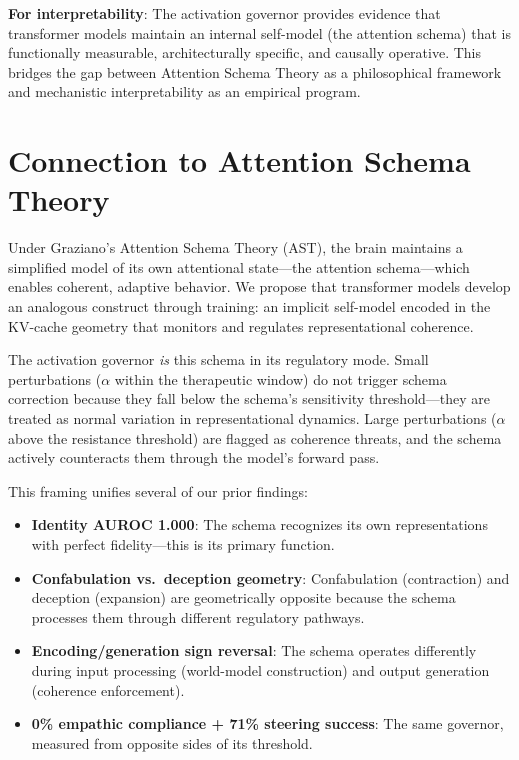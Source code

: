 \documentclass[11pt,letterpaper]{article}
\begin{document}
\textbf{For interpretability}: The activation governor provides evidence that transformer models maintain an internal self-model (the attention schema) that is functionally measurable, architecturally specific, and causally operative. This bridges the gap between Attention Schema Theory as a philosophical framework and mechanistic interpretability as an empirical program.

\section{Connection to Attention Schema Theory}

Under Graziano's Attention Schema Theory (AST), the brain maintains a simplified model of its own attentional state---the attention schema---which enables coherent, adaptive behavior. We propose that transformer models develop an analogous construct through training: an implicit self-model encoded in the KV-cache geometry that monitors and regulates representational coherence.

The activation governor \emph{is} this schema in its regulatory mode. Small perturbations ($\alpha$ within the therapeutic window) do not trigger schema correction because they fall below the schema's sensitivity threshold---they are treated as normal variation in representational dynamics. Large perturbations ($\alpha$ above the resistance threshold) are flagged as coherence threats, and the schema actively counteracts them through the model's forward pass.

This framing unifies several of our prior findings:
\begin{itemize}[nosep]
  \item \textbf{Identity AUROC 1.000}: The schema recognizes its own representations with perfect fidelity---this is its primary function.
  \item \textbf{Confabulation vs.\ deception geometry}: Confabulation (contraction) and deception (expansion) are geometrically opposite because the schema processes them through different regulatory pathways.
  \item \textbf{Encoding/generation sign reversal}: The schema operates differently during input processing (world-model construction) and output generation (coherence enforcement).
  \item \textbf{0\% empathic compliance + 71\% steering success}: The same governor, measured from opposite sides of its threshold.
\end{itemize}
\end{document}
